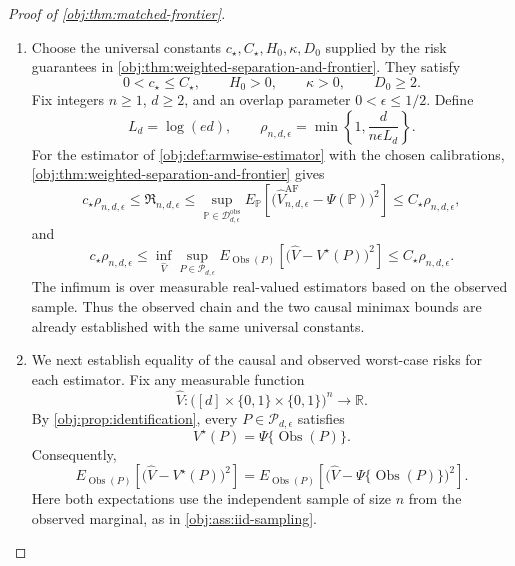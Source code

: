 \documentclass[11pt]{article}
\begin{document}
\begin{proof}[Proof of \cref{obj:thm:matched-frontier}]
\begin{enumerate}
\item Choose the universal constants \(c_\star,C_\star,H_0,\kappa,D_0\) supplied by the risk guarantees in \cref{obj:thm:weighted-separation-and-frontier}. They satisfy
\[
0<c_\star\le C_\star,\qquad H_0>0,\qquad \kappa>0,\qquad D_0\ge2.
\]
Fix integers \(n\ge1\), \(d\ge2\), and an overlap parameter \(0<\epsilon\le1/2\). Define
\[
L_d=\log(ed),
\qquad
\rho_{n,d,\epsilon}
=\min\left\{1,\frac{d}{n\epsilon L_d}\right\}.
\]
For the estimator of \cref{obj:def:armwise-estimator} with the chosen calibrations, \cref{obj:thm:weighted-separation-and-frontier} gives
\[
c_\star\rho_{n,d,\epsilon}
\le \mathfrak R_{n,d,\epsilon}
\le
\sup_{\mathbb P\in\mathcal D_{d,\epsilon}^{\mathrm{obs}}}
E_{\mathbb P}\!\left[
\bigl(\widehat V_{n,d,\epsilon}^{\mathrm{AF}}-\Psi(\mathbb P)\bigr)^2
\right]
\le C_\star\rho_{n,d,\epsilon},
\]
and
\[
c_\star\rho_{n,d,\epsilon}
\le
\inf_{\widehat V}
\sup_{P\in\mathcal P_{d,\epsilon}}
E_{\operatorname{Obs}(P)}\!\left[
\bigl(\widehat V-V^\star(P)\bigr)^2
\right]
\le C_\star\rho_{n,d,\epsilon}.
\]
The infimum is over measurable real-valued estimators based on the observed sample. Thus the observed chain and the two causal minimax bounds are already established with the same universal constants.

\item We next establish equality of the causal and observed worst-case risks for each estimator. Fix any measurable function
\[
\widehat V:
\bigl([d]\times\{0,1\}\times\{0,1\}\bigr)^n
\longrightarrow\mathbb R.
\]
By \cref{obj:prop:identification}, every \(P\in\mathcal P_{d,\epsilon}\) satisfies
\[
V^\star(P)=\Psi\{\operatorname{Obs}(P)\}.
\]
Consequently,
\[
E_{\operatorname{Obs}(P)}\!\left[
\bigl(\widehat V-V^\star(P)\bigr)^2
\right]
=
E_{\operatorname{Obs}(P)}\!\left[
\bigl(\widehat V-\Psi\{\operatorname{Obs}(P)\}\bigr)^2
\right].
\]
Here both expectations use the independent sample of size \(n\) from the observed marginal, as in \cref{obj:ass:iid-sampling}.


\end{enumerate}
\end{proof}
\end{document}
